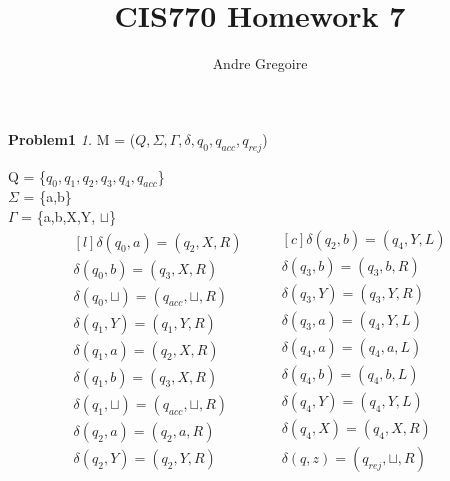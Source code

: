 \documentclass[12pt]{report}
\begin{document}
\newcommand\tab[1][1cm]{\hspace*{#1}}

\author{Andre Gregoire}
\title{CIS770 Homework 7}
\maketitle

\textbf{Problem1}\newline
\textit{1.}
M = ($Q, \Sigma, \Gamma, \delta, q_0, q_{acc}, q_{rej}$)
\begin{addmargin}[1cm]{0em}
Q = \{$q_0,q_1,q_2,q_3,q_4,q_{acc}$\}\\
$\Sigma$ = \{a,b\}\\
$\Gamma$ = \{a,b,X,Y, $\sqcup$\}\\
\begin{equation*}
	\begin{aligned}[l]
\delta(q_0, a) = (q_2, X, R) \\
\delta(q_0, b) = (q_3, X, R)\\
\delta(q_0, \sqcup) = (q_{acc}, \sqcup, R)\\
\delta(q_1, Y) = (q_1, Y, R)\\
\delta(q_1, a) = (q_2, X, R)\\
\delta(q_1, b) = (q_3, X, R)\\
\delta(q_1, \sqcup) = (q_{acc}, \sqcup, R)\\
\delta(q_2, a) = (q_2, a, R)\\
\delta(q_2, Y) = (q_2, Y, R)\\
\end{aligned}
	\quad\quad
	\begin{aligned}[c]
\delta(q_2, b) = (q_4, Y, L)\\	
\delta(q_3, b) = (q_3, b, R)\\
\delta(q_3, Y) = (q_3, Y, R)\\
\delta(q_3, a) = (q_4, Y, L)\\
\delta(q_4, a) = (q_4, a, L)\\
\delta(q_4, b) = (q_4, b, L)\\
\delta(q_4, Y) = (q_4, Y, L)\\
\delta(q_4, X) = (q_4, X, R)\\
\delta(q, z) = (q_{rej}, \sqcup, R) \\
	\end{aligned}
\end{equation*}
\end{addmargin}
\end{document}
